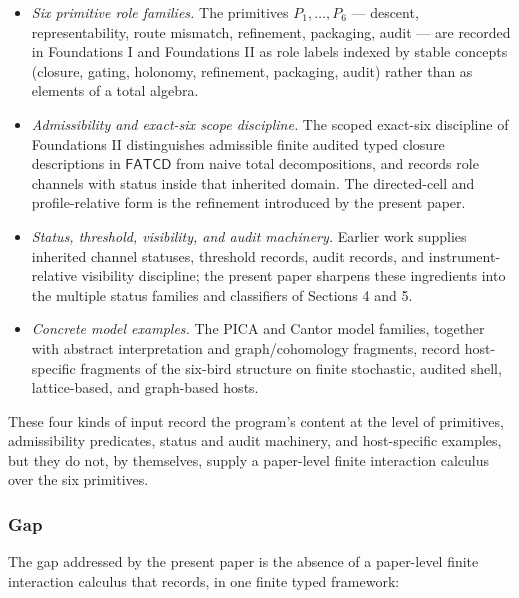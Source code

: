 \documentclass[11pt]{article}
\providecommand{\tightlist}{}
\theoremstyle{definition}
\begin{document}
\begin{itemize}
\tightlist
\item
  \emph{Six primitive role families.} The primitives \(P_{1},\ldots,P_{6}\) --- descent, representability, route mismatch, refinement, packaging, audit --- are recorded in Foundations I and Foundations II as role labels indexed by stable concepts (closure, gating, holonomy, refinement, packaging, audit) rather than as elements of a total algebra.
\item
  \emph{Admissibility and exact-six scope discipline.} The scoped exact-six discipline of Foundations II distinguishes admissible finite audited typed closure descriptions in \(\mathsf{FATCD}\) from naive total decompositions, and records role channels with status inside that inherited domain. The directed-cell and profile-relative form is the refinement introduced by the present paper.
\item
  \emph{Status, threshold, visibility, and audit machinery.} Earlier work supplies inherited channel statuses, threshold records, audit records, and instrument-relative visibility discipline; the present paper sharpens these ingredients into the multiple status families and classifiers of Sections 4 and 5.
\item
  \emph{Concrete model examples.} The PICA and Cantor model families, together with abstract interpretation and graph/cohomology fragments, record host-specific fragments of the six-bird structure on finite stochastic, audited shell, lattice-based, and graph-based hosts.
\end{itemize}

These four kinds of input record the program's content at the level of primitives, admissibility predicates, status and audit machinery, and host-specific examples, but they do not, by themselves, supply a paper-level finite interaction calculus over the six primitives.

\subsubsection{Gap}

The gap addressed by the present paper is the absence of a paper-level finite interaction calculus that records, in one finite typed framework:
\end{document}
